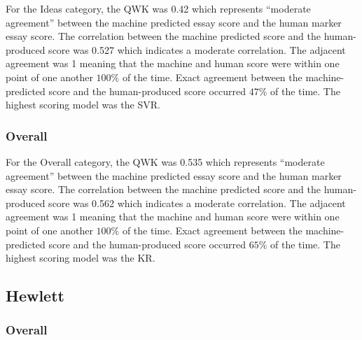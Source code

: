 For the Ideas category, the QWK was 0.42 which represents “moderate agreement” between the machine predicted essay score and the human marker essay score. The correlation between the machine predicted score and the human-produced score was 0.527 which indicates a moderate correlation. The adjacent agreement was 1 meaning that the machine and human score were within one point of one another $100\%$ of the time. Exact agreement between the machine-predicted score and the human-produced score occurred $47\%$ of the time. The highest scoring model was the SVR.

\subsubsection{Overall}

For the Overall category, the QWK was 0.535 which represents “moderate agreement” between the machine predicted essay score and the human marker essay score. The correlation between the machine predicted score and the human-produced score was 0.562 which indicates a moderate correlation. The adjacent agreement was 1 meaning that the machine and human score were within one point of one another $100\%$ of the time. Exact agreement between the machine-predicted score and the human-produced score occurred $65\%$ of the time. The highest scoring model was the KR.

\subsection{Hewlett}

\subsubsection{Overall}

\begin{table}[h]
\caption{trtgfhfgh}
\end{table}

